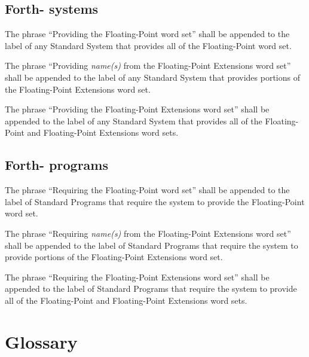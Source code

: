 \subsection{Forth-\snapshot{} systems} %

The phrase ``Providing the Floating-Point word set'' shall be
appended to the label of any Standard System that provides all of
the Floating-Point word set.

The phrase ``Providing \emph{name(s)} from the Floating-Point
Extensions word set'' shall be appended to the label of any Standard
System that provides portions of the Floating-Point Extensions word
set.

The phrase ``Providing the Floating-Point Extensions word set'' shall
be appended to the label of any Standard System that provides all of
the Floating-Point and Floating-Point Extensions word sets.

\subsection{Forth-\snapshot{} programs} %

The phrase ``Requiring the Floating-Point word set'' shall be
appended to the label of Standard Programs that require the system
to provide the Floating-Point word set.

The phrase ``Requiring \emph{name(s)} from the Floating-Point
Extensions word set'' shall be appended to the label of Standard
Programs that require the system to provide portions of the
Floating-Point Extensions word set.

The phrase ``Requiring the Floating-Point Extensions word set'' shall
be appended to the label of Standard Programs that require the system
to provide all of the Floating-Point and Floating-Point Extensions
word sets.


\section{Glossary} %

